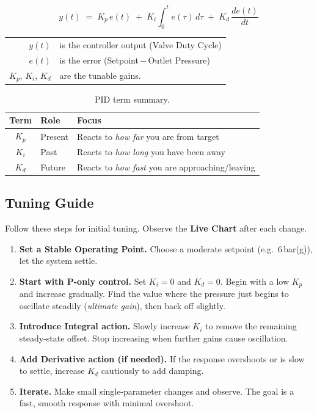\documentclass[
    11pt,
    a4paper,
    parskip=half-,          %
    headings=normal,        %
    captions=tableheading,  %
    numbers=noenddot        %
]{scrartcl}
\begin{document}
    \begin{equation*}
    y(t) \;=\; K_p \, e(t) \;+\; K_i \!\int_0^t e(\tau) \, d\tau \;+\; K_d \, \frac{de(t)}{dt}
    \end{equation*}

    \begin{tabular}{rl}
        $y(t)$ & is the controller output (Valve Duty Cycle)\\
        $e(t)$ & is the error (Setpoint\,$-$\,Outlet Pressure)\\
        $K_p$, $K_i$, $K_d$ & are the tunable gains.
    \end{tabular}


    \begin{table}[H]
        \centering
        \begin{tabular}{c|l|l}
        \textbf{Term} & \textbf{Role} & \textbf{Focus} \\ \hline
        $K_p$  & Present & Reacts to \emph{how far} you are from target \\
        $K_i$  & Past    & Reacts to \emph{how long} you have been away \\
        $K_d$  & Future  & Reacts to \emph{how fast} you are approaching/leaving
        \end{tabular}
        \caption{PID term summary.}
    \end{table}






\subsection{Tuning Guide}

Follow these steps for initial tuning. Observe the \textbf{Live Chart} after each change.

\begin{enumerate}
    \item \textbf{Set a Stable Operating Point.}
          Choose a moderate setpoint (e.g.\ 6\,bar(g)), let the system settle.

    \item \textbf{Start with P-only control.}
          Set $K_i = 0$ and $K_d = 0$.
          Begin with a low $K_p$ and increase gradually.
          Find the value where the pressure just begins to oscillate steadily (\emph{ultimate gain}), then back off slightly.

    \item \textbf{Introduce Integral action.}
          Slowly increase $K_i$ to remove the remaining steady-state offset.
          Stop increasing when further gains cause oscillation.

    \item \textbf{Add Derivative action (if needed).}
          If the response overshoots or is slow to settle, increase $K_d$ cautiously to add damping.

    \item \textbf{Iterate.}
          Make small single-parameter changes and observe.
          The goal is a fast, smooth response with minimal overshoot.
\end{enumerate}
\end{document}
